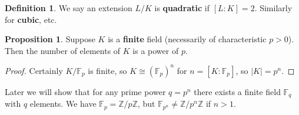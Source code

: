 \documentclass{article}
\theoremstyle{definition}
\newtheorem{prop}[theorem]{Proposition}
\newtheorem{defn}{Definition}[section]
\begin{document}
\begin{defn}
    We say an extension $L/K$ is \textbf{quadratic} if $[L:K] = 2$. Similarly for \textbf{cubic}, etc.
\end{defn}
\begin{prop}
    Suppose $K$ is a \textbf{finite} field (necessarily of characteristic $p>0$). Then the number of elements of $K$ is a power of $p$.
\end{prop}
\begin{proof}
    Certainly $K/\mathbb{F}_p$ is finite, so $K \cong (\mathbb{F}_p)^n$ for $n = [K : \mathbb{F}_p]$, so $|K| = p^n$.
\end{proof}
Later we will show that for any prime power $q = p^n$ there exists a finite field $\mathbb{F}_q$ with $q$ elements. We have $\mathbb{F}_p = \mathbb{Z}/p\mathbb{Z}$, but $\mathbb{F}_{p^n} \neq \mathbb{Z}/p^n\mathbb{Z}$ if $n>1$.
\vspace{1mm}
\end{document}
